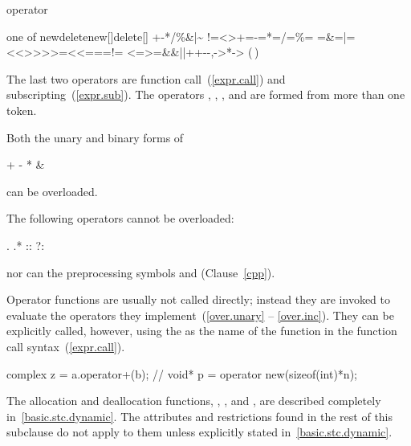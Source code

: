 \begin{bnf}
\br
     operator
\end{bnf}

\begin{bnfkeywordtab}
 \textnormal{one of}\br
\>new\>delete\>new[]\>delete[]\br
\>+\>-\>*\>/\>\%\>\caret\>\&\>|\>\~\br
\>!\>=\><\>>\>+=\>-=\>*=\>/=\>\%=\br
\>\caret=\>\&=\>|=\><<\>>>\>>>=\><<=\>={=}\>!=\br
\><=\>>=\>\&\&\>|{|}\>++\>-{-}\>,\>->*\>->\br
\>(\,)\>[\,]
\end{bnfkeywordtab}

\begin{note}
The last two operators are function call~(\ref{expr.call})
and subscripting~(\ref{expr.sub}).
The operators
,
,
\tcode{()},
and
\tcode{[]}
are formed from more than one token.
\end{note}
%
%

\pnum
Both the unary and binary forms of

\begin{codeblock}
+    -    *     &
\end{codeblock}

can be overloaded.

\pnum
{}%
The following operators cannot be overloaded:

\begin{codeblock}
.    .*   ::    ?:
\end{codeblock}

nor can the preprocessing symbols
\tcode{\#}
and
\tcode{\#\#}
(Clause~\ref{cpp}).

\pnum
{}%
Operator functions are usually not called directly; instead they are invoked
to evaluate the operators they implement~(\ref{over.unary} -- \ref{over.inc}).
They can be explicitly called, however, using the
as the name of the function in the function call syntax~(\ref{expr.call}).
\begin{example}

\begin{codeblock}
complex z = a.operator+(b);     // 
void* p = operator new(sizeof(int)*n);
\end{codeblock}
\end{example}

\pnum
The allocation and deallocation functions,
,
,
and
,
are described completely in~\ref{basic.stc.dynamic}.
The attributes and restrictions
found in the rest of this subclause do not apply to them unless explicitly
stated in~\ref{basic.stc.dynamic}.

